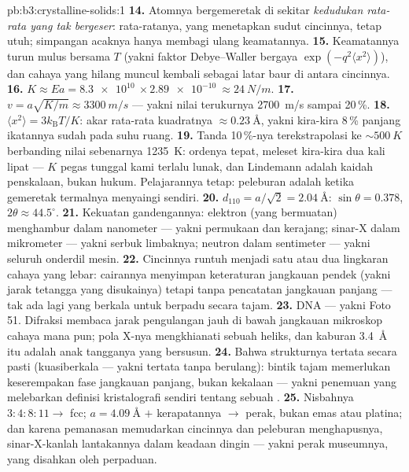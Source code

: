 \begin{solution}{pb:b3:crystalline-solids:1}
\textbf{14.} Atomnya bergemeretak di sekitar \emph{kedudukan rata-rata yang
tak bergeser}:  rata-ratanya, yang menetapkan sudut cincinnya, tetap utuh;
simpangan acaknya hanya membagi ulang keamatannya.
\textbf{15.} Keamatannya turun mulus bersama $T$ (yakni faktor
Debye--Waller bergaya $\exp(-q^2\langle x^2\rangle)$), dan cahaya yang
hilang muncul kembali sebagai latar baur di antara cincinnya.
\textbf{16.} $K \approx Ea = \qty{8.3e10}{}\times
\qty{2.89e-10}{} \approx \qty{24}{N/m}$.
\textbf{17.} $v = a\sqrt{K/m} \approx \qty{3300}{m/s}$ ---
yakni nilai terukurnya \qty{2700}{m/s} sampai 20\,\%.
\textbf{18.} $\langle x^2\rangle = 3k_{\text{B}}T/K$: akar rata-rata
kuadratnya $\approx\qty{0.23}{\angstrom}$, yakni kira-kira 8\,\% panjang
ikatannya sudah pada suhu ruang.
\textbf{19.} Tanda 10\,\%-nya terekstrapolasi ke $\sim\qty{500}{K}$
berbanding nilai sebenarnya \qty{1235}{K}: ordenya tepat, meleset kira-kira
dua kali lipat --- $K$ pegas tunggal kami terlalu lunak, dan Lindemann adalah
kaidah penskalaan, bukan hukum. Pelajarannya tetap: peleburan adalah ketika
gemeretak termalnya menyaingi  sendiri.
\textbf{20.} $d_{110} = a/\sqrt2 = \qty{2.04}{\angstrom}$:
$\sin\theta = 0.378$, $2\theta \approx 44.5^\circ$.
\textbf{21.} Kekuatan gandengannya: elektron (yang bermuatan) menghambur dalam
nanometer --- yakni permukaan dan kerajang; sinar-X dalam mikrometer ---
yakni serbuk limbaknya; neutron dalam sentimeter --- yakni seluruh onderdil mesin.
\textbf{22.} Cincinnya runtuh menjadi satu atau dua lingkaran cahaya yang lebar:
cairannya menyimpan keteraturan jangkauan pendek (yakni jarak tetangga yang
disukainya) tetapi tanpa pencatatan jangkauan panjang --- tak ada lagi yang
berkala untuk berpadu secara tajam.
\textbf{23.} DNA --- yakni Foto 51. Difraksi membaca jarak
pengulangan jauh di bawah jangkauan mikroskop cahaya mana pun; pola X-nya
mengkhianati sebuah heliks, dan kaburan \qty{3.4}{\angstrom} itu adalah
anak tangganya yang bersusun.
\textbf{24.} Bahwa strukturnya tertata secara pasti
(kuasiberkala --- yakni tertata tanpa berulang): bintik tajam memerlukan
keserempakan fase jangkauan panjang, bukan kekalaan --- yakni penemuan
yang melebarkan definisi kristalografi sendiri tentang sebuah .
\textbf{25.} Nisbahnya $3:4:8:11 \to$ fcc; $a = \qty{4.09}{\angstrom}$
$+$ kerapatannya $\to$ perak, bukan emas atau platina; dan karena pemanasan
memudarkan cincinnya dan peleburan menghapusnya, sinar-X-kanlah lantakannya
dalam keadaan dingin --- yakni perak museumnya, yang disahkan oleh perpaduan.
\end{solution}
